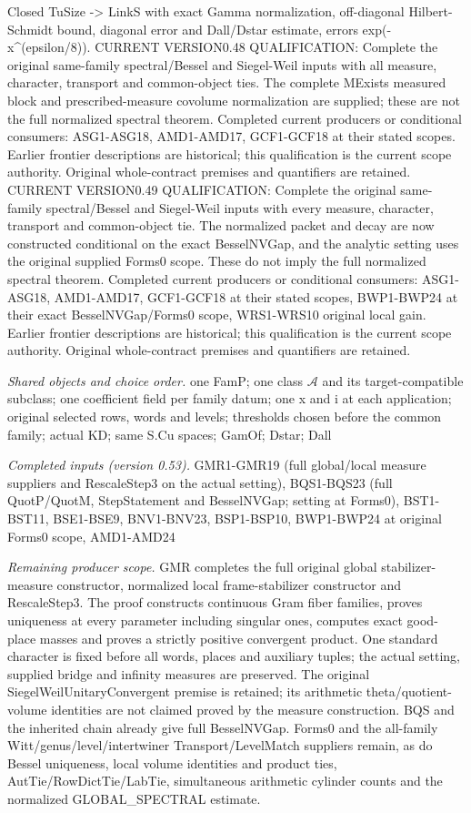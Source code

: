 Closed TuSize -> LinkS with exact Gamma normalization, off-diagonal Hilbert-Schmidt bound, diagonal error and Dall/Dstar estimate, errors exp(-x\textasciicircum{}(epsilon/8)). CURRENT VERSION0.48 QUALIFICATION: Complete the original same-family spectral/Bessel and Siegel-Weil inputs with all measure, character, transport and common-object ties. The complete MExists measured block and prescribed-measure covolume normalization are supplied; these are not the full normalized spectral theorem. Completed current producers or conditional consumers: ASG1-ASG18, AMD1-AMD17, GCF1-GCF18 at their stated scopes. Earlier frontier descriptions are historical; this qualification is the current scope authority. Original whole-contract premises and quantifiers are retained. CURRENT VERSION0.49 QUALIFICATION: Complete the original same-family spectral/Bessel and Siegel-Weil inputs with every measure, character, transport and common-object tie. The normalized packet and decay are now constructed conditional on the exact BesselNVGap, and the analytic setting uses the original supplied Forms0 scope. These do not imply the full normalized spectral theorem. Completed current producers or conditional consumers: ASG1-ASG18, AMD1-AMD17, GCF1-GCF18 at their stated scopes, BWP1-BWP24 at their exact BesselNVGap/Forms0 scope, WRS1-WRS10 original local gain. Earlier frontier descriptions are historical; this qualification is the current scope authority. Original whole-contract premises and quantifiers are retained.

\emph{Shared objects and choice order.} one FamP; one class $\mathcal A$ and its target-compatible subclass; one coefficient field per family datum; one x and i at each application; original selected rows, words and levels; thresholds chosen before the common family; actual KD; same S.Cu spaces; GamOf; Dstar; Dall

\emph{Completed inputs (version 0.53).} GMR1-GMR19 (full global/local measure suppliers and RescaleStep3 on the actual setting), BQS1-BQS23 (full QuotP/QuotM, StepStatement and BesselNVGap; setting at Forms0), BST1-BST11, BSE1-BSE9, BNV1-BNV23, BSP1-BSP10, BWP1-BWP24 at original Forms0 scope, AMD1-AMD24

\emph{Remaining producer scope.} GMR completes the full original global stabilizer-measure constructor, normalized local frame-stabilizer constructor and RescaleStep3. The proof constructs continuous Gram fiber families, proves uniqueness at every parameter including singular ones, computes exact good-place masses and proves a strictly positive convergent product. One standard character is fixed before all words, places and auxiliary tuples; the actual setting, supplied bridge and infinity measures are preserved. The original SiegelWeilUnitaryConvergent premise is retained; its arithmetic theta/quotient-volume identities are not claimed proved by the measure construction. BQS and the inherited chain already give full BesselNVGap. Forms0 and the all-family Witt/genus/level/intertwiner Transport/LevelMatch suppliers remain, as do Bessel uniqueness, local volume identities and product ties, AutTie/RowDictTie/LabTie, simultaneous arithmetic cylinder counts and the normalized GLOBAL\_\allowbreak SPECTRAL estimate.

